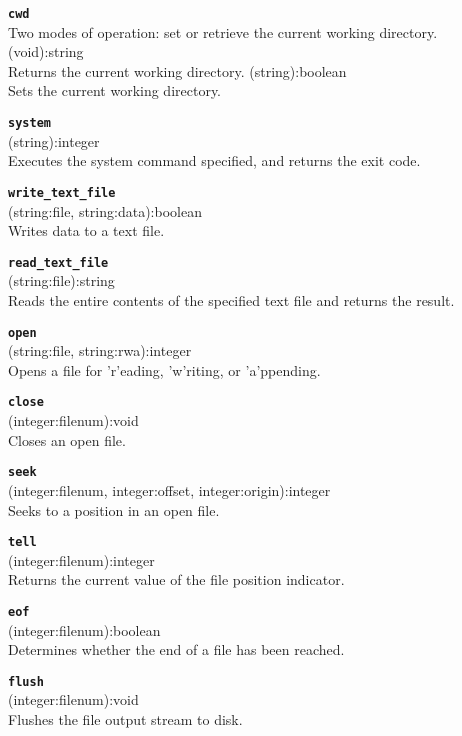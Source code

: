 \documentclass{article}
\begin{document}
{\large \texttt{\textbf{cwd}}}\\
Two modes of operation: set or retrieve the current working directory.
\textsf{ (void):string }\\
Returns the current working directory.
\textsf{ (string):boolean }\\
Sets the current working directory.

{\large \texttt{\textbf{system}}}\\
\textsf{ (string):integer }\\
Executes the system command specified, and returns the exit code.

{\large \texttt{\textbf{write\_text\_file}}}\\
\textsf{ (string:file, string:data):boolean }\\
Writes data to a text file.

{\large \texttt{\textbf{read\_text\_file}}}\\
\textsf{ (string:file):string }\\
Reads the entire contents of the specified text file and returns the result.

{\large \texttt{\textbf{open}}}\\
\textsf{ (string:file, string:rwa):integer }\\
Opens a file for 'r'eading, 'w'riting, or 'a'ppending.

{\large \texttt{\textbf{close}}}\\
\textsf{ (integer:filenum):void }\\
Closes an open file.

{\large \texttt{\textbf{seek}}}\\
\textsf{ (integer:filenum, integer:offset, integer:origin):integer }\\
Seeks to a position in an open file.

{\large \texttt{\textbf{tell}}}\\
\textsf{ (integer:filenum):integer }\\
Returns the current value of the file position indicator.

{\large \texttt{\textbf{eof}}}\\
\textsf{ (integer:filenum):boolean }\\
Determines whether the end of a file has been reached.

{\large \texttt{\textbf{flush}}}\\
\textsf{ (integer:filenum):void }\\
Flushes the file output stream to disk.
\end{document}
